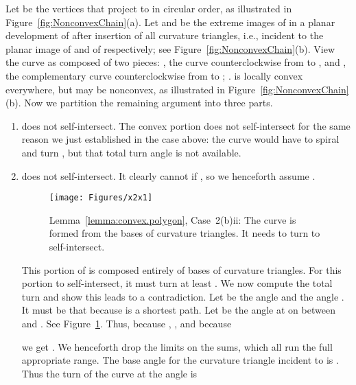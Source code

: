 \pdfoutput=1  \documentclass[]{article}
\newcommand{\hide}[1]{}
\newcommand{\ABox}{
\raisebox{3pt}{\framebox[6pt]{\rule{6pt}{0pt}}}
}
\newenvironment{proof}{{\bf Proof:}}{\hfill\ABox}
\newcommand{\figlab}[1]{\label{fig:#1}}
\newcommand{\lemref}[1]{\ref{lemma:#1}}
\newcommand{\figref}[1]{\ref{fig:#1}}
\begin{document}
\begin{proof}
\begin{enumerate}
\begin{enumerate}
Let  be the vertices that project to 
in circular order,
as illustrated in Figure~\figref{NonconvexChain}(a).
\hide{
Insert the curvature triangles one by one, for .
The first rotates the ``elbow''
 by  about  to an elbow with ray ,
the second insertion rotates the second elbow by  about ,
and so on, as illustrated in~(b,c,d) of the figure.
Let  be the elbow angle at , the angle between  and  on .
It must be that ,
because  is a shortest path.
This angle condition ensures that 
successive elbows do not intersect, and so they 
bound between them ``quasicones'' with disjoint interiors, 
and disjoint
from the original cone delimited by  and ,
which remains after the final rotation~(d).
}Let  and  be the extreme images of  in a planar
development of 
after insertion of all curvature triangles, i.e.,
incident to the planar image of  and of  respectively;
see Figure~\figref{NonconvexChain}(b).
View the curve  as composed of two pieces:
, the curve counterclockwise from  to ,
and , the complementary curve counterclockwise from 
to ; .
 is locally convex everywhere, but
 may be nonconvex, as illustrated in Figure~\figref{NonconvexChain}(b).
Now we partition the remaining argument into three parts.

\begin{enumerate}
\item  does not self-intersect.
The convex portion does not self-intersect for the same
reason we just established in the case above:
the curve would have to spiral and turn , but
that total turn angle is not available.

\item  does not self-intersect.
It clearly cannot if , so we
henceforth assume .
\begin{figure}[htbp]
\centering
\texttt{[image: Figures/x2x1]}
\caption{Lemma~\protect\lemref{convex.polygon}, Case~2(b)ii: 
The curve  is formed from the bases
of curvature triangles. It needs to turn  to self-intersect.}
\figlab{x2x1}
\end{figure}


This portion of  is composed entirely of bases of
curvature triangles.  For this portion to self-intersect, it must
turn at least .  We now compute the total turn  and show this
leads to a contradiction.
Let  be the angle  and  the angle .
It must be that  because  is a shortest path.
Let  be the angle at  on  between  and .
See Figure~\figref{x2x1}.
Thus,
because ,
, 
and because
 
we get
.
We henceforth drop the limits on the sums, which all run
the full appropriate range.
The base angle for the curvature triangle incident to 
is .
Thus the turn of the curve at the angle  is 


\end{enumerate}
\end{enumerate}
\end{enumerate}
\end{proof}
\end{document}

